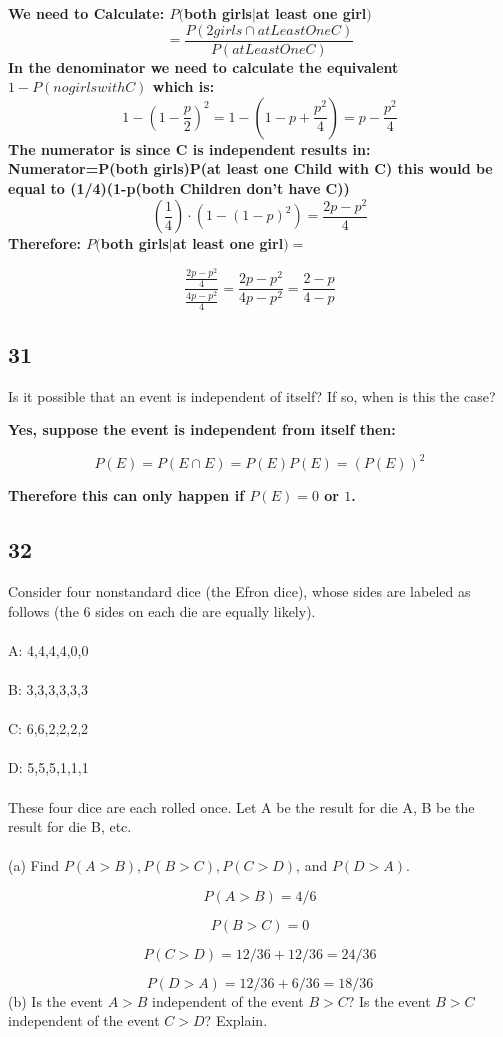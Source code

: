 \documentclass{article}
\begin{document}
\textbf{We need to Calculate: $P($both girls$|$at least one girl$)$}
$$=\frac{P(2girls \cap atLeastOneC)}{P(atLeastOneC)}$$
\textbf{In the denominator we need to calculate the equivalent $1-P(no girls with C)$ which is:}
$$1-(1-\frac{p}{2})^2=1-(1-p+\frac{p^2}{4})=p- \frac{p^2}{4}$$
\textbf{The numerator is since C is independent results in: Numerator=P(both girls)P(at least one Child with C)
this would be equal to (1/4)(1-p(both Children don't have C))
}
$$(\frac{1}{4}) \cdot (1-(1-p)^2)=\frac{2p-p^2}{4}$$
\textbf{Therefore: $P($both girls$|$at least one girl$)=$}

$$\frac{\frac{2p-p^2}{4}}{\frac{4p-p^2}{4}}=\frac{2p-p^2}{4p-p^2}=\frac{2-p}{4-p}$$
\newpage
\subsection{31}
Is it possible that an event is independent of itself? If so, when is this the case?

\textbf{Yes, suppose the event is independent from itself then:}

$$P(E)=P(E \cap E)=P(E)P(E)=(P(E))^2$$

\textbf{Therefore this can only happen if $P(E)=0$ or $1$.}
\subsection{32}
Consider four nonstandard dice (the Efron dice), whose sides are labeled as follows (the 6 sides on each die are equally likely).\\\\
A: 4,4,4,4,0,0 \\\\
B: 3,3,3,3,3,3 \\\\
C: 6,6,2,2,2,2 \\\\
D: 5,5,5,1,1,1 \\\\
These four dice are each rolled once. Let A be the result for die A, B be the result for die B, etc.\\\\
(a) Find $P(A > B),P(B > C),P(C > D)$, and $P(D > A)$.

$$P(A>B)=4/6$$

$$P(B >C)=0$$

$$P(C>D)=12/36+12/36=24/36$$

$$P(D>A)=12/36+6/36=18/36$$
(b) Is the event $A > B$ independent of the event $B > C$? Is the event $B > C$ independent
of the event $C > D$? Explain.
\end{document}
